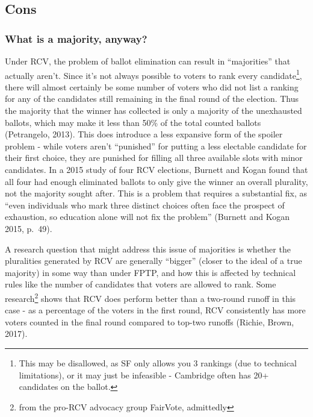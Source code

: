 \documentclass[12pt,twoside]{reedthesis}
\theoremstyle{definition}
\theoremstyle{definition}
\theoremstyle{definition}
\theoremstyle{remark}
\begin{document}
\hypertarget{cons}{%
\subsection{Cons}\label{cons}}

\hypertarget{what-is-a-majority-anyway}{%
\subsubsection{What is a majority,
anyway?}\label{what-is-a-majority-anyway}}

Under RCV, the problem of ballot elimination can result in
``majorities'' that actually aren't. Since it's not always possible to
voters to rank every candidate\footnote{This may be disallowed, as SF
  only allows you 3 rankings (due to technical limitations), or it may
  just be infeasible - Cambridge often has 20+ candidates on the ballot.},
there will almost certainly be some number of voters who did not list a
ranking for any of the candidates still remaining in the final round of
the election. Thus the majority that the winner has collected is only a
majority of the unexhausted ballots, which may make it less than 50\% of
the total counted ballots (Petrangelo, 2013). This does introduce a less
expansive form of the spoiler problem - while voters aren't ``punished''
for putting a less electable candidate for their first choice, they are
punished for filling all three available slots with minor candidates. In
a 2015 study of four RCV elections, Burnett and Kogan found that all
four had enough eliminated ballots to only give the winner an overall
plurality, not the majority sought after. This is a problem that
requires a substantial fix, as ``even individuals who mark three
distinct choices often face the prospect of exhaustion, so education
alone will not fix the problem'' (Burnett and Kogan 2015, p.~49).

A research question that might address this issue of majorities is
whether the pluralities generated by RCV are generally ``bigger''
(closer to the ideal of a true majority) in some way than under FPTP,
and how this is affected by technical rules like the number of
candidates that voters are allowed to rank. Some research\footnote{from
  the pro-RCV advocacy group FairVote, admittedly} shows that RCV does
perform better than a two-round runoff in this case - as a percentage of
the voters in the first round, RCV consistently has more voters counted
in the final round compared to top-two runoffs (Richie, Brown, 2017).
\end{document}
